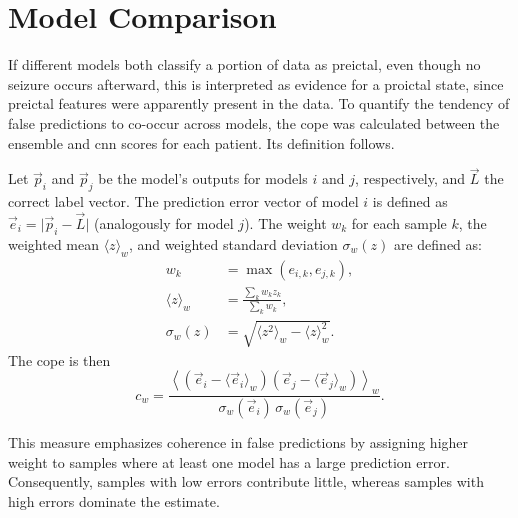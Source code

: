 

\section{Model Comparison} \label{sec:model-comparison}
If different models both classify a portion of data as preictal, even though no seizure occurs afterward, this is interpreted as evidence for a proictal state, since preictal features were apparently present in the data.
To quantify the tendency of false predictions to co-occur across models, the \gls{cope} \parencite{muller_coherent_2022} was calculated between the ensemble and \gls{cnn} scores for each patient.
Its definition follows.

Let $\vec{p}_i$ and $\vec{p}_j$ be the model's outputs for models $i$ and $j$, respectively, and $\vec{L}$ the correct label vector.
The prediction error vector of model $i$ is defined as $\vec{e}_i=\lvert\vec{p}_i-\vec{L}\rvert$ (analogously for model $j$).
The weight $w_k$ for each sample $k$, the weighted mean $\langle z\rangle_w$, and weighted standard deviation $\sigma_w(z)$ are defined as:
\begin{equation} \label{eq:cope-helpers}
    \begin{aligned}
        w_k &= \max(e_{i,k},e_{j,k}),\\
        \langle z\rangle_w &= \frac{\sum_k w_k z_k}{\sum_k w_k},\\
        \sigma_w(z) &= \sqrt{\langle z^2\rangle_w-\langle z\rangle_w^2}.
    \end{aligned}
\end{equation}
The \gls{cope} is then
\begin{equation} \label{eq:cope}
    c_w=\frac{\left\langle\left(\vec{e}_i-\langle \vec{e}_i\rangle_w\right)\left(\vec{e}_j-\langle \vec{e}_j\rangle_w\right)\right\rangle_w}
    {\sigma_w(\vec{e}_i)\,\sigma_w(\vec{e}_j)}.
\end{equation}

This measure emphasizes coherence in false predictions by assigning higher weight to samples where at least one model has a large prediction error.
Consequently, samples with low errors contribute little, whereas samples with high errors dominate the estimate.